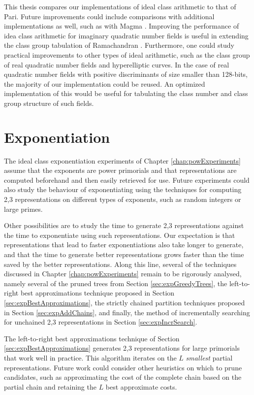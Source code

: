 \documentclass{ucalgthes1}
\theoremstyle{definition}
\begin{document}
This thesis compares our implementations of ideal class arithmetic to that of Pari.  Future improvements could include comparisons with additional implementations as well, such as with Magma \cite{Magma}.  Improving the performance of idea class arithmetic for imaginary quadratic number fields is useful in extending the class group tabulation of Ramachandran \cite{Ramachandran2006}.  Furthermore, one could study practical improvements to other types of ideal arithmetic, such as the class group of real quadratic number fields and hyperelliptic curves.  In the case of real quadratic number fields with positive discriminants of size smaller than 128-bits, the majority of our implementation could be reused.  An optimized implementation of this would be useful for tabulating the class number and class group structure of such fields.

\section{Exponentiation}
\label{sec:futureExponentiation}

The ideal class exponentiation experiments of Chapter \ref{chap:powExperiments} assume that the exponents are power primorials and that representations are computed beforehand and then easily retrieved for use.  Future experiments could also study the behaviour of exponentiating using the techniques for computing 2,3 representations on different types of exponents, such as random integers or large primes.

Other possibilities are to study the time to generate 2,3 representations against the time to exponentiate using such representations.  Our expectation is that representations that lead to faster exponentiations also take longer to generate, and that the time to generate better representations grows faster than the time saved by the better representations.  Along this line, several of the techniques discussed in Chapter \ref{chap:powExperiments} remain to be rigorously analysed, namely several of the pruned trees from Section \ref{sec:expGreedyTrees}, the left-to-right best approximations technique proposed in Section \ref{sec:expBestApproximations}, the strictly chained partition techniques proposed in Section \ref{sec:expAddChains}, and finally, the method of incrementally searching for unchained 2,3 representations in Section \ref{sec:expIncrSearch}.

The left-to-right best approximations technique of Section \ref{sec:expBestApproximations} generates 2,3 representations for large primorials that work well in practice.  This algorithm iterates on the $L$ \emph{smallest} partial representations.  Future work could consider other heuristics on which to prune candidates, such as approximating the cost of the complete chain based on the partial chain and retaining the $L$ best approximate costs.
\end{document}
